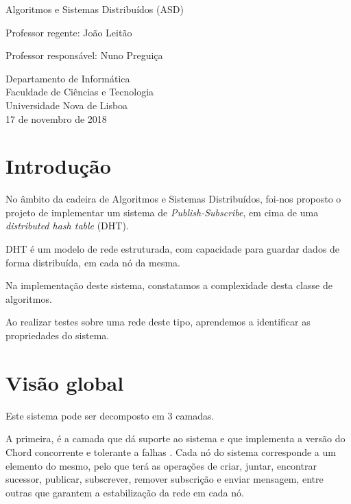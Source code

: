 \documentclass[12pt]{article}
\begin{document}
\begin{titlepage}
\begin{center}
        Algoritmos e Sistemas Distribuídos (ASD)
        
        \vspace{0.5cm}

		Professor regente: 
		João Leitão
		
		Professor responsável:
		Nuno Preguiça
		
        \vspace{0.5cm}
                
        Departamento de Informática\\
        Faculdade de Ciências e Tecnologia\\
        Universidade Nova de Lisboa\\
        17 de novembro de 2018
    \end{center}
\end{titlepage}

\newpage
\tableofcontents

\newpage
\listoffigures

\newpage
\section{Introdução}

No âmbito da cadeira de Algoritmos e Sistemas Distribuídos, foi-nos proposto o projeto de implementar um sistema de \emph{Publish-Subscribe}, em cima de uma \emph{distributed hash table} (DHT).

DHT é um modelo de rede estruturada, com capacidade para guardar dados de forma distribuída, em cada nó da mesma.

Na implementação deste sistema, constatamos a complexidade desta classe de algoritmos.

Ao realizar testes sobre uma rede deste tipo, aprendemos a identificar as propriedades do sistema.

\newpage
\section{Visão global}

Este sistema pode ser decomposto em 3 camadas.

A primeira, é a camada que dá suporte ao sistema e que implementa a versão do Chord concorrente e tolerante a falhas \cite{b2}. Cada nó do sistema corresponde a um elemento do mesmo, pelo que terá as operações de criar, juntar, encontrar sucessor, publicar, subscrever, remover subscrição e enviar mensagem, entre outras que garantem a estabilização da rede em cada nó.
\end{document}
